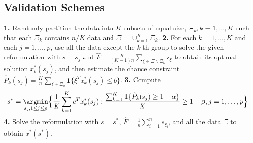 \documentclass[mnsc,blindrev]{informs4} %
\begin{document}


\begin{APPENDICES}
\section{Validation Schemes}\label{appendix:validation-schemes}

\begin{algorithm}[H]
\caption{K-Fold Cross Validation}
\label{kfold}
\begin{algorithmic}
\vspace{1ex}
\STATE \textbf{1.} Randomly partition the data into $K$ subsets of equal size, $\Xi_k,k=1,\ldots,K$ such that each $\Xi_k$ contains $n/K$ data and $\Xi=\cup_{k=1}^K\Xi_k$.
\STATE \textbf{2.} For each $k=1,\ldots,K$ and each $j=1,\ldots,p$, use all the data except the $k$-th group to solve the given reformulation with $s=s_j$ and $\hat F=\frac{K}{(K-1)n}\sum_{\xi\in\Xi\backslash \Xi_k}s_{\xi}$ to obtain its optimal solution $x^*_k(s_j)$, and then estimate the chance constraint $\hat P_k(s_j)=\frac{K}{n}\sum_{\xi\in \Xi_k}\mathbf{1}\{\xi^Tx^*_k(s_j)\leq b\}$.
\STATE \textbf{3.} Compute
\begin{equation*}
    s^* = \underset{s_j,1\leq j\leq p}\argmin\Big\{\frac{1}{K}\sum_{k=1}^Kc^Tx^*_k(s_j): \frac{\sum_{k=1}^K\mathbf{1}\{\hat P_k(s_j)\geq 1-\alpha\}}{K}\geq 1-\beta,j=1,\ldots,p\Big\}
\end{equation*}
\STATE \textbf{4.} Solve the reformulation with $s=s^*$, $\hat F=\frac{1}{n}\sum_{i=1}^ns_{\xi_i}$, and all the data $\Xi$ to obtain $x^*(s^*)$.

\vspace{1ex}
\end{algorithmic}
\end{algorithm}




\end{APPENDICES}
\end{document}
